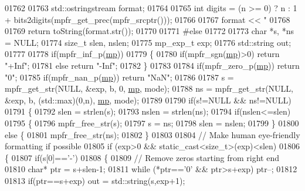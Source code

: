 \begin{DoxyCode}
01762 
01763     std::ostringstream format;
01764 
01765     \textcolor{keywordtype}{int} digits = (n >= 0) ? n : 1 + bits2digits(mpfr\_get\_prec(mpfr\_srcptr()));
01766 
01767     format << \textcolor{stringliteral}{"%
01768 
01769     \textcolor{keywordflow}{return} toString(format.str());
01770 
01771 \textcolor{preprocessor}{#else}
01772 
01773     \textcolor{keywordtype}{char} *s, *ns = NULL;
01774     \textcolor{keywordtype}{size\_t} slen, nslen;
01775     mp\_exp\_t exp;
01776     std::string out;
01777 
01778     \textcolor{keywordflow}{if}(mpfr\_inf\_p(\hyperlink{namespaceboost_1_1multiprecision}{mp}))
01779     \{
01780         \textcolor{keywordflow}{if}(mpfr\_sgn(\hyperlink{namespaceboost_1_1multiprecision}{mp})>0) \textcolor{keywordflow}{return} \textcolor{stringliteral}{"+Inf"};
01781         \textcolor{keywordflow}{else}               \textcolor{keywordflow}{return} \textcolor{stringliteral}{"-Inf"};
01782     \}
01783 
01784     \textcolor{keywordflow}{if}(mpfr\_zero\_p(\hyperlink{namespaceboost_1_1multiprecision}{mp})) \textcolor{keywordflow}{return} \textcolor{stringliteral}{"0"};
01785     \textcolor{keywordflow}{if}(mpfr\_nan\_p(\hyperlink{namespaceboost_1_1multiprecision}{mp}))  \textcolor{keywordflow}{return} \textcolor{stringliteral}{"NaN"};
01786 
01787     s  = mpfr\_get\_str(NULL, &exp, b, 0, \hyperlink{namespaceboost_1_1multiprecision}{mp}, mode);
01788     ns = mpfr\_get\_str(NULL, &exp, b, (std::max)(0,n), \hyperlink{namespaceboost_1_1multiprecision}{mp}, mode);
01789 
01790     \textcolor{keywordflow}{if}(s!=NULL && ns!=NULL)
01791     \{
01792         slen  = strlen(s);
01793         nslen = strlen(ns);
01794         \textcolor{keywordflow}{if}(nslen<=slen)
01795         \{
01796             mpfr\_free\_str(s);
01797             s = ns;
01798             slen = nslen;
01799         \}
01800         \textcolor{keywordflow}{else} \{
01801             mpfr\_free\_str(ns);
01802         \}
01803 
01804         \textcolor{comment}{// Make human eye-friendly formatting if possible}
01805         \textcolor{keywordflow}{if} (exp>0 && static\_cast<size\_t>(exp)<slen)
01806         \{
01807             \textcolor{keywordflow}{if}(s[0]==\textcolor{charliteral}{'-'})
01808             \{
01809                 \textcolor{comment}{// Remove zeros starting from right end}
01810                 \textcolor{keywordtype}{char}* ptr = s+slen-1;
01811                 \textcolor{keywordflow}{while} (*ptr==\textcolor{charliteral}{'0'} && ptr>s+exp) ptr--;
01812 
01813                 \textcolor{keywordflow}{if}(ptr==s+exp) out = std::string(s,exp+1);
}
\end{DoxyCode}

